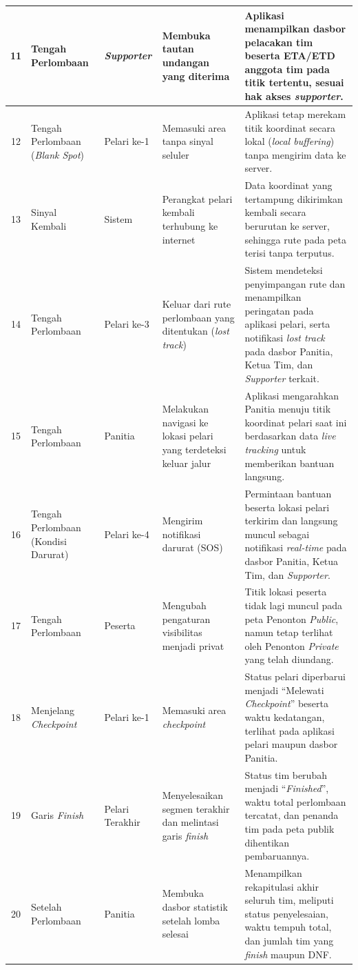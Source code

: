 \begin{longtable}{|c|p{2cm}|p{1.5cm}|p{3cm}|p{5cm}|}
11 & Tengah Perlombaan & \textit{Supporter} & Membuka tautan undangan yang diterima & Aplikasi menampilkan dasbor pelacakan tim beserta ETA/ETD anggota tim pada titik tertentu, sesuai hak akses \textit{supporter}. \\ \hline
12 & Tengah Perlombaan (\textit{Blank Spot}) & Pelari ke-1 & Memasuki area tanpa sinyal seluler & Aplikasi tetap merekam titik koordinat secara lokal (\textit{local buffering}) tanpa mengirim data ke server. \\ \hline
13 & Sinyal Kembali & Sistem & Perangkat pelari kembali terhubung ke internet & Data koordinat yang tertampung dikirimkan kembali secara berurutan ke server, sehingga rute pada peta terisi tanpa terputus. \\ \hline
14 & Tengah Perlombaan & Pelari ke-3 & Keluar dari rute perlombaan yang ditentukan (\textit{lost track}) & Sistem mendeteksi penyimpangan rute dan menampilkan peringatan pada aplikasi pelari, serta notifikasi \textit{lost track} pada dasbor Panitia, Ketua Tim, dan \textit{Supporter} terkait. \\ \hline
15 & Tengah Perlombaan & Panitia & Melakukan navigasi ke lokasi pelari yang terdeteksi keluar jalur & Aplikasi mengarahkan Panitia menuju titik koordinat pelari saat ini berdasarkan data \textit{live tracking} untuk memberikan bantuan langsung. \\ \hline
16 & Tengah Perlombaan (Kondisi Darurat) & Pelari ke-4 & Mengirim notifikasi darurat (SOS) & Permintaan bantuan beserta lokasi pelari terkirim dan langsung muncul sebagai notifikasi \textit{real-time} pada dasbor Panitia, Ketua Tim, dan \textit{Supporter}. \\ \hline
17 & Tengah Perlombaan & Peserta & Mengubah pengaturan visibilitas menjadi privat & Titik lokasi peserta tidak lagi muncul pada peta Penonton \textit{Public}, namun tetap terlihat oleh Penonton \textit{Private} yang telah diundang. \\ \hline
18 & Menjelang \textit{Checkpoint} & Pelari ke-1 & Memasuki area \textit{checkpoint} & Status pelari diperbarui menjadi ``Melewati \textit{Checkpoint}'' beserta waktu kedatangan, terlihat pada aplikasi pelari maupun dasbor Panitia. \\ \hline
19 & Garis \textit{Finish} & Pelari Terakhir & Menyelesaikan segmen terakhir dan melintasi garis \textit{finish} & Status tim berubah menjadi ``\textit{Finished}'', waktu total perlombaan tercatat, dan penanda tim pada peta publik dihentikan pembaruannya. \\ \hline
20 & Setelah Perlombaan & Panitia & Membuka dasbor statistik setelah lomba selesai & Menampilkan rekapitulasi akhir seluruh tim, meliputi status penyelesaian, waktu tempuh total, dan jumlah tim yang \textit{finish} maupun DNF. \\ \hline
\end{longtable}
